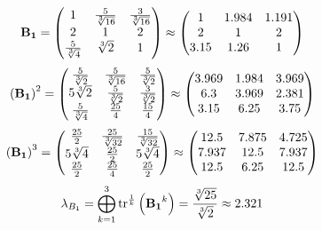 \documentclass[10pt,a4paper]{article}
\begin{document}
	\[
		\bold{B_1} = 
		\begin{pmatrix}
			{1} {} & \frac{{5}} {\sqrt[3]{16}} & \frac{{3}} {\sqrt[3]{16}} \\
			{{2}} {} & {1} {} & {{2}} {} \\
			\frac{{5}} {\sqrt[3]{4}} & {\sqrt[3]{2}} {} & {1} {} \\
		\end{pmatrix}
		\approx
		\begin{pmatrix}
			1        & 1.984    & 1.191    \\
			2        & 1        & 2        \\
			3.15     & 1.26     & 1        \\
		\end{pmatrix}
	\]
	\[
		\left(\bold{B_1}\right)^{2} = 
		\begin{pmatrix}
			\frac{{5}} {\sqrt[3]{2}} & \frac{{5}} {\sqrt[3]{16}} & \frac{{5}} {\sqrt[3]{2}} \\
			{{5}\sqrt[3]{2}} {} & \frac{{5}} {\sqrt[3]{2}} & \frac{{3}} {\sqrt[3]{2}} \\
			\frac{{5}} {\sqrt[3]{4}} & \frac{{25}} {{4}} & \frac{{15}} {{4}} \\
		\end{pmatrix}
		\approx
		\begin{pmatrix}
			3.969    & 1.984    & 3.969    \\
			6.3      & 3.969    & 2.381    \\
			3.15     & 6.25     & 3.75     \\
		\end{pmatrix}
	\]
	\[
		\left(\bold{B_1}\right)^{3} = 
		\begin{pmatrix}
			\frac{{25}} {{2}} & \frac{{25}} {\sqrt[3]{32}} & \frac{{15}} {\sqrt[3]{32}} \\
			{{5}\sqrt[3]{4}} {} & \frac{{25}} {{2}} & {{5}\sqrt[3]{4}} {} \\
			\frac{{25}} {{2}} & \frac{{25}} {{4}} & \frac{{25}} {{2}} \\
		\end{pmatrix}
		\approx
		\begin{pmatrix}
			12.5     & 7.875    & 4.725    \\
			7.937    & 12.5     & 7.937    \\
			12.5     & 6.25     & 12.5     \\
		\end{pmatrix}
	\]
	\[
		\lambda_{B_1} =  \bigoplus ^{3} _{k = 1} \operatorname{tr} ^{\frac 1 k} \left( \bold{B_1} ^k \right) = \frac{\sqrt[3]{25}} {\sqrt[3]{2}}\approx 2.321
	\]
\end{document}
